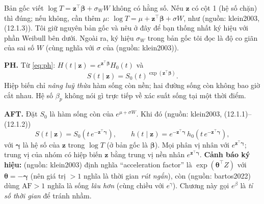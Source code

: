 \documentclass[11pt,a4paper,notitlepage]{report}
\newcommand{\tr}{^{\top}}
\providecommand{\nguon}[1]{(nguồn: #1)}
\begin{document}
\begin{chinhsua}
Bản gốc viết $\log T=\bm z\tr\bm\beta+\sigma_WW$ không có hằng số. Nếu $\bm z$ có cột 1 (hệ số chặn) thì đúng; nếu không, cần thêm $\mu$:
$\log T=\mu+\bm z\tr\bm\beta+\sigma W$, như \nguon{klein2003, (12.1.3)}. Tôi giữ nguyên bản gốc và nêu ở đây để bạn thống nhất ký hiệu với phần Weibull bên dưới. Ngoài ra, ký hiệu $\sigma_W$ trong bản gốc tôi đọc là độ co giãn của sai số $W$ (cùng nghĩa với $\sigma$ của \nguon{klein2003}).
\end{chinhsua}

\begin{bosung}
\textbf{PH.} Từ \eqref{eq:ph}: $H(t\mid\bm z)=e^{\bm z\tr\bm\beta}H_0(t)$ và
\begin{equation}
S(t\mid\bm z)=S_0(t)^{\exp(\bm z\tr\bm\beta)}.
\end{equation}
Hiệp biến chỉ \emph{nâng luỹ thừa} hàm sống còn nền; hai đường sống còn không bao giờ cắt nhau. Hệ số $\beta_p$ không nói gì trực tiếp về xác suất sống tại một thời điểm.

\textbf{AFT.} Đặt $S_0$ là hàm sống còn của $e^{\mu+\sigma W}$. Khi đó \nguon{klein2003, (12.1.1)--(12.1.2)}
\begin{equation}
S(t\mid\bm z)=S_0\!\left(t\,e^{-\bm z\tr\bm\gamma}\right),\qquad h(t\mid\bm z)=e^{-\bm z\tr\bm\gamma}\,h_0\!\left(t\,e^{-\bm z\tr\bm\gamma}\right),
\end{equation}
với $\bm\gamma$ là hệ số của $\bm z$ trong $\log T$ (ở bản gốc là $\bm\beta$). Mọi phân vị nhân với $e^{\bm z\tr\bm\gamma}$; trung vị của nhóm có hiệp biến $\bm z$ bằng trung vị nền nhân $e^{\bm z\tr\bm\gamma}$.
\textbf{Cảnh báo ký hiệu:} \nguon{klein2003} định nghĩa ``acceleration factor'' là $\exp(\bm\theta\tr Z)$ với $\bm\theta=-\bm\gamma$ (nên giá trị $>1$ nghĩa là thời gian \emph{rút ngắn}),
còn \nguon{bartos2022} dùng $\mathrm{AF}>1$ nghĩa là sống \emph{lâu hơn} (cùng chiều với $e^{\gamma}$). Chương này gọi $e^{\beta}$ là \emph{tỉ số thời gian} để tránh nhầm.


\end{bosung}
\end{document}
